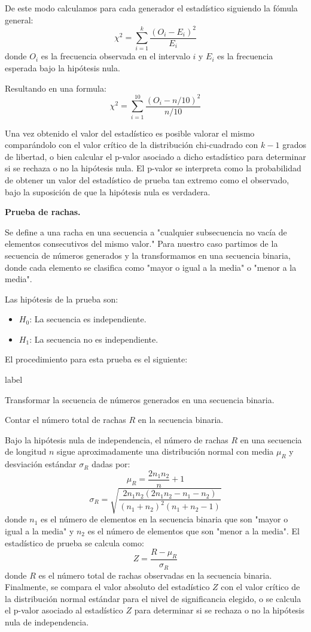 \documentclass{article}
\begin{document}
De este modo calculamos para cada generador el estadístico siguiendo la fómula general:
$$\chi^2 = \sum_{i=1}^{k} \frac{(O_i - E_i)^2}{E_i}$$
donde $O_i$ es la frecuencia observada en el intervalo $i$ y $E_i$ es la frecuencia esperada bajo la hipótesis nula.

Resultando en una formula:
$$\chi^2 = \sum_{i=1}^{10} \frac{(O_i - n/10)^2}{n/10}$$

Una vez obtenido el valor del estadístico es posible valorar el mismo comparándolo con el valor crítico de la distribución chi-cuadrado con $k-1$ grados de libertad, o bien calcular el p-valor asociado a dicho estadístico para determinar si se rechaza o no la hipótesis nula.
El p-valor se interpreta como la probabilidad de obtener un valor del estadístico de prueba tan extremo como el observado, bajo la suposición de que la hipótesis nula es verdadera.


\textbf{Prueba de rachas.}

Se define a una racha en una secuencia a "cualquier subsecuencia no vacía de elementos consecutivos del mismo valor."
Para nuestro caso partimos de la secuencia de números generados y la transformamos en una secuencia binaria, donde cada elemento se clasifica como "mayor o igual a la media" o "menor a la media".

Las hipótesis de la prueba son:
\begin{itemize}
  \item $H_0$: La secuencia es independiente.
  \item $H_1$: La secuencia no es independiente.
\end{itemize}
El procedimiento para esta prueba es el siguiente:
\begin{list}{label}{}
  \item [1.] Transformar la secuencia de números generados en una secuencia binaria.
  \item [2.] Contar el número total de rachas $R$ en la secuencia binaria.
\end{list}
Bajo la hipótesis nula de independencia, el número de rachas $R$ en una secuencia de longitud $n$ sigue aproximadamente una distribución normal con media $\mu_R$ y desviación estándar $\sigma_R$ dadas por:
$$\mu_R = \frac{2n_1 n_2}{n} + 1$$
$$\sigma_R = \sqrt{\frac{2n_1 n_2 (2n_1 n_2 - n_1 - n_2)}{(n_1+n_2)^2 (n_1 + n_2 - 1)}}$$
donde $n_1$ es el número de elementos en la secuencia binaria que son "mayor o igual a la media" y $n_2$ es el número de elementos que son "menor a la media".
El estadístico de prueba se calcula como:
$$Z = \frac{R - \mu_R}{\sigma_R}$$
donde $R$ es el número total de rachas observadas en la secuencia binaria.
Finalmente, se compara el valor absoluto del estadístico $Z$ con el valor crítico de la distribución normal estándar para el nivel de significancia elegido, o se calcula el p-valor asociado al estadístico $Z$ para determinar si se rechaza o no la hipótesis nula de independencia.
\end{document}
